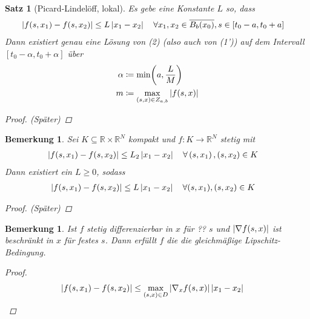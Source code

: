 \documentclass[11pt, a4paper]{article}
\theoremstyle{plain}
\newtheorem{bemerkung}[blockelement]{Bemerkung}
\newtheorem{satz}[blockelement]{Satz}
\numberwithin{equation}{subsection}
\newcommand{\pair}[1]{\left(#1\right)}
\newcommand{\of}[1]{\mathopen{}\mathclose{}\bgroup\left(#1\aftergroup\egroup\right)}
\newcommand{\abs}[1]{\left\lvert#1\right\rvert}
\newcommand{\interv}[1]{\left[#1\right]}
\newcommand{\R}{\mathbb{R}}
\begin{document}
    \begin{satz}[Picard-Lindelöff, lokal]
        \label{satz:temp-2}
        Es gebe eine Konstante $L$ so, dass
        \begin{align*}
            \abs{f\of{s, x_1} - f\of{s, x_2}} &\leq L \abs{x_1 - x_2}\quad\forall x_1, x_2\in\overline{B_b\of{x_0}}, s\in\interv{t_0 - a, t_0 + a}
        \end{align*}
        Dann existiert genau eine Lösung von (2) (also auch von (1')) auf dem Intervall $\interv{t_0 - \alpha, t_0 + \alpha}$ über
        \begin{align*}
            \alpha &\coloneqq \min\of{a, \frac{L}{M}}\\
            m &\coloneqq \max_{(s, x)\in Z_{a,b}} \abs{f\of{s, x}}
        \end{align*}
        \begin{proof}
        (Später)
        \end{proof}
    \end{satz}

    \begin{bemerkung}
        Sei $K\subseteq \R\times\R^N$ kompakt und $f: K \to\R^N$ stetig mit
        \begin{align*}
            \abs{f\of{s, x_1} - f\of{s, x_2}} &\leq L_2\abs{x_1 - x_2}\quad\forall \pair{s, x_1}, \pair{s, x_2} \in K
        \end{align*}
        Dann existiert ein $L\geq 0$, sodass
        \begin{align*}
            \abs{f\of{s, x_1} - f\of{s, x_2}} &\leq L \abs{x_1 - x_2}\quad\forall (s, x_1), (s, x_2)\in K
        \end{align*}

        \begin{proof}
        (Später)
        \end{proof}
    \end{bemerkung}

    \begin{bemerkung}
        Ist $f$ stetig differenzierbar in $x$ für ?? $s$ und $\abs{\nabla f\of{s, x}}$ ist beschränkt in $x$ für festes $s$. Dann erfüllt $f$ die die gleichmäßige Lipschitz-Bedingung.

        \begin{proof}
            \begin{align*}
                \abs{f\of{s, x_1} - f\of{s, x_2}} &\leq \max_{(s, x)\in D} \abs{\nabla_x f\of{s, x}}\abs{x_1 - x_2}\qedhere
            \end{align*}
        \end{proof}
    \end{bemerkung}
\end{document}
